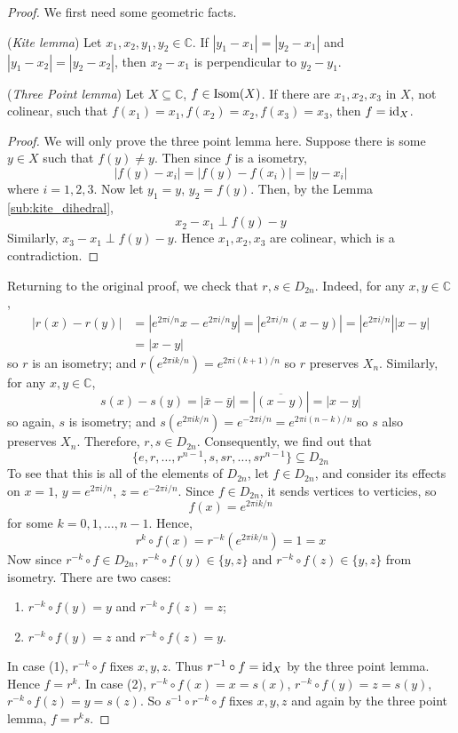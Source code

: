 \documentclass[10pt, a4paper, twoside]{report}
\begin{document}
\begin{proof}
    We first need some geometric facts.
    \begin{lemma}
        (\emph{Kite lemma}) Let \(x_1,x_2,y_1,y_2\in\mathbb{C}\). If \(|y_1-x_1|=|y_2-x_1|\) and \(|y_1-x_2|=|y_2-x_2|\), then \(x_2-x_1\) is perpendicular to \(y_2-y_1\).
        \label{sub:kite_dihedral}
    \end{lemma}
    \begin{lemma}
        (\emph{Three Point lemma}) Let \(X\subseteq\mathbb{C}\), \(f\in\operatorname{Isom}(X)\). If there are \(x_1,x_2,x_3\) in \(X\), not colinear, such that \(f(x_1)=x_1,f(x_2)=x_2, f(x_3)=x_3\), then \(f=\operatorname{id}_X\).
    \end{lemma}
    \begin{proof}
        We will only prove the three point lemma here. Suppose there is some \(y\in X\) such that \(f(y)\neq y\). Then since \(f\) is a isometry, 
        \[|f(y)-x_i|=|f(y)-f(x_i)|=|y-x_i|\]
        where \(i=1,2,3\). Now let \(y_1=y\), \(y_2=f(y)\). Then, by the Lemma \ref{sub:kite_dihedral}, 
        \[x_2-x_1\perp f(y)-y\]
        Similarly, \(x_3-x_1\perp f(y)-y\). Hence \(x_1,x_2,x_3\) are colinear, which is a contradiction. 
    \end{proof}
    Returning to the original proof, we check that \(r,s\in D_{2n}\). Indeed, for any \(x,y\in\mathbb{C}\), 
    \begin{align*}
        |r(x)-r(y)|&=|e^{2\pi i/n}x-e^{2\pi i/n}y|=|e^{2\pi i/n}(x-y)|=|e^{2\pi i/n}||x-y| \\
        &=|x-y|
    \end{align*} 
    so \(r\) is an isometry; and \(r(e^{2\pi ik/n})=e^{2\pi i(k+1)/n}\) so \(r\) preserves \(X_n\). Similarly, for any \(x,y\in\mathbb{C}\),
    \[s(x)-s(y)=|\bar{x}-\bar{y}|=|\overline{(x-y)}|=|x-y|\]
    so again, \(s\) is isometry; and \(s(e^{2\pi ik/n})=e^{-2\pi i/n}=e^{2\pi i(n-k)/n}\) so \(s\) also preserves \(X_n\). Therefore, \(r,s\in D_{2n}\). Consequently, we find out that 
    \[\{e,r,\ldots,r^{n-1},s,sr,\ldots,sr^{n-1}\}\subseteq D_{2n}\]
    To see that this is all of the elements of \(D_{2n}\), let \(f\in D_{2n}\), and consider its effects on \(x=1\), \(y=e^{2\pi i/n}\), \(z=e^{-2\pi i/n}\). Since \(f\in D_{2n}\), it sends vertices to verticies, so 
    \[f(x)=e^{2\pi ik/n}\]
    for some \(k=0,1,\ldots,n-1\). Hence, 
    \[r^k\circ f(x)=r^{-k}(e^{2\pi ik/n})=1=x\]
    Now since \(r^{-k}\circ f\in D_{2n}\), \(r^{-k}\circ f(y)\in\{y,z\}\) and \(r^{-k}\circ f(z)\in\{y,z\}\) from isometry. There are two cases:
    \begin{enumerate}
        \item \(r^{-k}\circ f(y)=y\) and \(r^{-k}\circ f(z)=z\);
        \item \(r^{-k}\circ f(y)=z\) and \(r^{-k}\circ f(z)=y\).
    \end{enumerate}
    In case (1), \(r^{-k}\circ f\) fixes \(x,y,z\). Thus \(r^{-1}\circ f=\operatorname{id}_X\) by the three point lemma. Hence \(f=r^k\). In case (2), \(r^{-k}\circ f(x)=x=s(x)\), \(r^{-k}\circ f(y)=z=s(y)\), \(r^{-k}\circ f(z)=y=s(z)\). So \(s^{-1}\circ r^{-k}\circ f\) fixes \(x,y,z\) and again by the three point lemma, \(f=r^ks\).


\end{proof}
\end{document}
